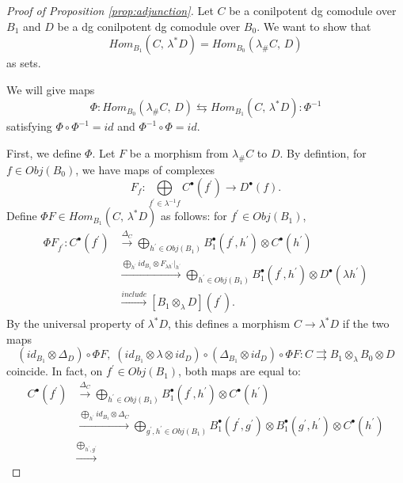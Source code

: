 \begin{proof}[Proof of Proposition \ref{prop:adjunction}]
Let $C$ be a conilpotent dg comodule 
over $B_1$ and $D$ be a dg 
conilpotent dg comodule over $B_0$.
We want to show that
$$
Hom_{B_1}(C,\, \lambda^*D) = 
Hom_{B_0}(\lambda_\# C,\, D)
$$
as sets.

We will give maps 
$$
\Phi: Hom_{B_0}
(\lambda_\# C,\, D) \leftrightarrows Hom_{B_1}
(C,\, \lambda^*D): \Phi^{-1}
$$ 
satisfying 
$\Phi \circ \Phi^{-1} = id$ and 
$\Phi^{-1} \circ \Phi = id$. 

First, we define 
$\Phi$. Let 
$F$ be a morphism from $\lambda_\# C$ to $D$. 
By defintion, for $f \in Obj(B_0)$, we 
have maps of complexes
$$
F_f: 
\bigoplus \limits_{f^\prime \in \lambda^{-1}f}
C^\bullet(f^\prime)
\to D^\bullet(f).
$$
Define $\Phi F \in Hom_{B_1}(C,\, \lambda^*D)$ 
as follows: for $f^\prime \in Obj(B_1)$,
\begin{equation}\label{eqn:Phi_F}
\begin{split}
\Phi F_{f^\prime}:
C^\bullet(f^\prime)
&
\xrightarrow{\Delta_C}
\bigoplus \limits_{h^\prime \in Obj(B_1)}
  B_1^\bullet(f^\prime, h^\prime) 
  \otimes C^\bullet(h^\prime) \\
&
\xrightarrow{\bigoplus 
  \limits_{h^\prime}
  id_{B_1}\otimes 
  F_{\lambda h^\prime}|_{h^\prime}}
\bigoplus \limits_{h^\prime \in Obj(B_1)}
  B_1^\bullet(f^\prime, h^\prime) 
  \otimes D^\bullet(\lambda h^\prime) \\
&
\xrightarrow{include}
[B_1 \otimes_\lambda D](f^\prime).
\end{split}
\end{equation}
By the universal property of $\lambda^*D$, 
this defines a morphism $C \to \lambda^*D$ 
if the two maps
$$
(id_{B_1}\otimes \Delta_D) \circ \Phi F, \;
(id_{B_1}\otimes \lambda \otimes id_D)\circ 
  (\Delta_{B_1}\otimes id_D) \circ 
  \Phi F: 
C \rightrightarrows
B_1 \otimes_\lambda B_0\otimes D  
$$
coincide. In fact, on $f^\prime \in Obj(B_1)$,
both maps are equal to:
\begin{align*}
C^\bullet(f^\prime)
& \xrightarrow{\Delta_C}
\bigoplus \limits_{h^\prime \in Obj(B_1)}
  B_1^\bullet(f^\prime, h^\prime)
  \otimes C^\bullet(h^\prime)\\
& \xrightarrow{\bigoplus \limits_{h^\prime} 
  id_{B_1} \otimes \Delta_C}
\bigoplus \limits_{g^\prime, h^\prime \in Obj(B_1)}
  B_1^\bullet(f^\prime, g^\prime)
  \otimes B_1^\bullet(g^\prime, h^\prime)
  \otimes C^\bullet(h^\prime)\\
& \xrightarrow{\bigoplus \limits_{h^\prime,g^\prime}
}
\end{align*}
\end{proof}
